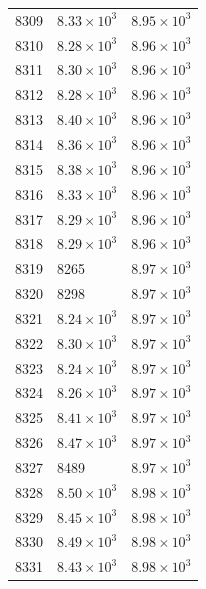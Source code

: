 \begin{table}[H]
\begin{tabular}{lll}
8309 & $\displaystyle 8.33 \times 10^{3}$ & $\displaystyle 8.95 \times 10^{3}$ \\
8310 & $\displaystyle 8.28 \times 10^{3}$ & $\displaystyle 8.96 \times 10^{3}$ \\
8311 & $\displaystyle 8.30 \times 10^{3}$ & $\displaystyle 8.96 \times 10^{3}$ \\
8312 & $\displaystyle 8.28 \times 10^{3}$ & $\displaystyle 8.96 \times 10^{3}$ \\
8313 & $\displaystyle 8.40 \times 10^{3}$ & $\displaystyle 8.96 \times 10^{3}$ \\
8314 & $\displaystyle 8.36 \times 10^{3}$ & $\displaystyle 8.96 \times 10^{3}$ \\
8315 & $\displaystyle 8.38 \times 10^{3}$ & $\displaystyle 8.96 \times 10^{3}$ \\
8316 & $\displaystyle 8.33 \times 10^{3}$ & $\displaystyle 8.96 \times 10^{3}$ \\
8317 & $\displaystyle 8.29 \times 10^{3}$ & $\displaystyle 8.96 \times 10^{3}$ \\
8318 & $\displaystyle 8.29 \times 10^{3}$ & $\displaystyle 8.96 \times 10^{3}$ \\
8319 & 8265 & $\displaystyle 8.97 \times 10^{3}$ \\
8320 & 8298 & $\displaystyle 8.97 \times 10^{3}$ \\
8321 & $\displaystyle 8.24 \times 10^{3}$ & $\displaystyle 8.97 \times 10^{3}$ \\
8322 & $\displaystyle 8.30 \times 10^{3}$ & $\displaystyle 8.97 \times 10^{3}$ \\
8323 & $\displaystyle 8.24 \times 10^{3}$ & $\displaystyle 8.97 \times 10^{3}$ \\
8324 & $\displaystyle 8.26 \times 10^{3}$ & $\displaystyle 8.97 \times 10^{3}$ \\
8325 & $\displaystyle 8.41 \times 10^{3}$ & $\displaystyle 8.97 \times 10^{3}$ \\
8326 & $\displaystyle 8.47 \times 10^{3}$ & $\displaystyle 8.97 \times 10^{3}$ \\
8327 & 8489 & $\displaystyle 8.97 \times 10^{3}$ \\
8328 & $\displaystyle 8.50 \times 10^{3}$ & $\displaystyle 8.98 \times 10^{3}$ \\
8329 & $\displaystyle 8.45 \times 10^{3}$ & $\displaystyle 8.98 \times 10^{3}$ \\
8330 & $\displaystyle 8.49 \times 10^{3}$ & $\displaystyle 8.98 \times 10^{3}$ \\
8331 & $\displaystyle 8.43 \times 10^{3}$ & $\displaystyle 8.98 \times 10^{3}$ \\

\end{tabular}
\end{table}
